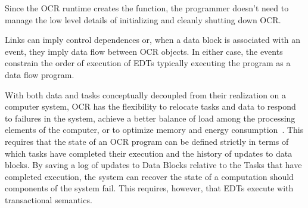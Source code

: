 %
Since the OCR runtime creates the 
function, the programmer doesn't need to manage the low level
details of initializing and cleanly shutting down OCR.
%


Links can imply control dependences or, when a data block is
associated with an event, they imply data flow between OCR objects.
In either case, the events constrain the order of execution of EDTs
typically executing the program as a data flow program.

With both data and tasks conceptually decoupled from their realization
on a computer system, OCR has the flexibility to relocate tasks and data
to respond to failures in the system, achieve a better balance of load
among the processing elements of the computer, or to optimize memory
and energy consumption~\cite{GZCS10,Guo10,CTBCCGYS13,SbBS14}.
This requires that the state of an OCR program can be defined
strictly in terms of which tasks have completed their execution
and the history of updates to data blocks. By saving a log of updates to Data Blocks
relative to the Tasks that have completed execution, the system can recover
the state of a computation should components of the system fail.  This requires,
however, that EDTs execute with transactional semantics.

